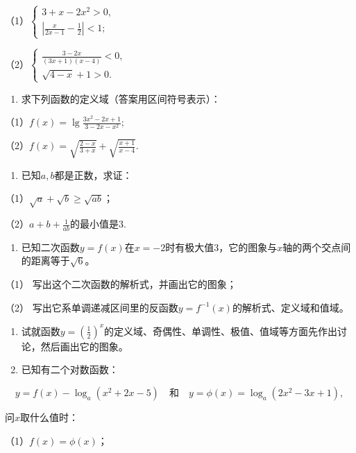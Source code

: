 （1）\(\left\{ \begin{array}{l} 3 + x - 2x^2 > 0, \\ \left| \frac{x}{2x - 1} - \frac{1}{2} \right| < 1; \end{array} \right.\)

（2）\(\left\{ \begin{array}{l} \frac{3 - 2x}{(3x + 1)(x - 4)} < 0, \\ \sqrt{4 - x} + 1 > 0. \end{array} \right.\)

\begin{enumerate}[start=2]
\item
  求下列函数的定义域（答案用区间符号表示）：
\end{enumerate}

（1）\(f(x) = \lg \frac{3x^2 - 2x + 1}{3 - 2x - x^2};\)

（2）\(f(x) = \sqrt{\frac{2 - x}{3 + x}} +\sqrt{\frac{x + 1}{x - 4}}.\)

\begin{enumerate}[start=8]
\item
  已知\(a, b\)都是正数，求证：
\end{enumerate}

（1）\(\sqrt{a} + \sqrt{b} \geq \sqrt{ab}\)；

（2）\(a + b + \frac{1}{ab}\)的最小值是3.

\begin{enumerate}[start=4]
\item
  已知二次函数\(y = f(x)\)在\(x = -2\)时有极大值3，它的图象与\(x\)轴的两个交点间的距离等于\(\sqrt{6}\)。
\end{enumerate}

（1） 写出这个二次函数的解析式，并画出它的图象；

（2）
写出它系单调递减区间里的反函数\(y = f^{-1}(x)\)的解析式、定义域和值域。

\begin{enumerate}[start=5]
\item
  试就函数\(y = \left(\frac{1}{2}\right)^x\)的定义域、奇偶性、单调性、极值、值域等方面先作出讨论，然后画出它的图象。
\item
  已知有二个对数函数：
\end{enumerate}

\[
y = f (x) - \log_{a} (x^{2} + 2 x - 5) \quad \text{和} \quad y = \phi (x) = \log_{a} (2 x^{2} - 3 x + 1),
\]

问\(x\)取什么值时：

（1）\(f(x) = \phi (x)\)；

